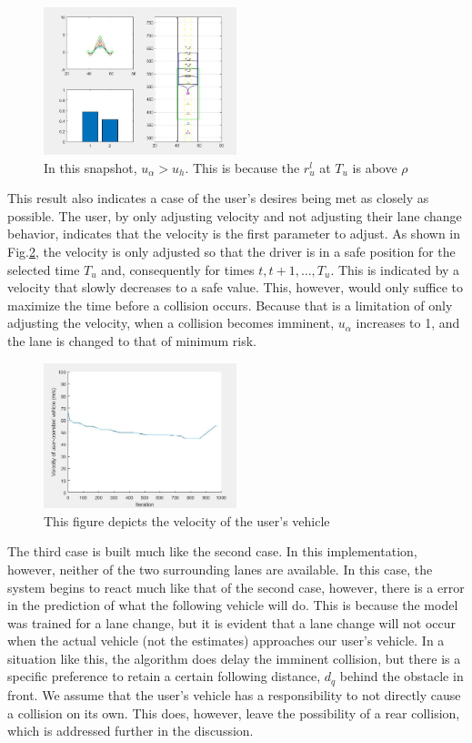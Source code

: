 \documentclass[letterpaper, 10 pt, conference]{ieeeconf}  %
\begin{document}
\begin{figure}[ht]
    \includegraphics[width=0.5\textwidth]{cs2.JPG}
    \caption{In this snapshot, $u_{\alpha} > u_{h}$. This is because the $r^l_u$ at $T_u$ is above $\rho$}
    \label{fig:cs2}
\end{figure}

This result also indicates a case of the user's desires being met as closely as possible. The user, by only adjusting velocity and not adjusting their lane change behavior, indicates that the velocity is the first parameter to adjust. As shown in Fig.\ref{fig:cs2c}, the velocity is only adjusted so that the driver is in a safe position for the selected time $T_u$ and, consequently for times $t,t+1,\ldots,T_u$. This is indicated by a velocity that slowly decreases to a safe value. This, however, would only suffice to maximize the time before a collision occurs. Because that is a limitation of only adjusting the velocity, when a collision becomes imminent, $u_\alpha$ increases to 1, and the lane is changed to that of minimum risk.

\begin{figure}[ht]
    \includegraphics[width=0.5\textwidth]{cs2c.JPG}
    \caption{This figure depicts the velocity of the user's vehicle}
    \label{fig:cs2c}
\end{figure}

The third case is built much like the second case. In this implementation, however, neither of the two surrounding lanes are available. In this case, the system begins to react much like that of the second case, however, there is a error in the prediction of what the following vehicle will do. This is because the model was trained for a lane change, but it is evident that a lane change will not occur when the actual vehicle (not the estimates) approaches our user's vehicle. In a situation like this, the algorithm does delay the imminent collision, but there is a specific preference to retain a certain following distance, $d_q$ behind the obstacle in front. We assume that the user's vehicle has a responsibility to not directly cause a collision on its own. This does, however, leave the possibility of a rear collision, which is addressed further in the discussion.
\end{document}
